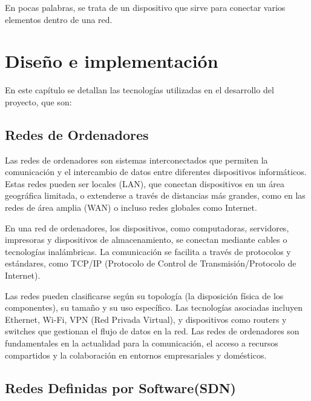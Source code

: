 \documentclass[a4paper, 12pt]{book}
\begin{document}
	En pocas palabras, se trata de un dispositivo que sirve para conectar varios elementos dentro de una red.
	
	
	\cleardoublepage
	\chapter{Diseño e implementación}
	\label{sec:diseno}
	 
		
	En este capítulo se detallan las tecnologías utilizadas en el desarrollo del proyecto, que son:
	
	\section{Redes de Ordenadores} 
	\label{sec:redes}
	
	Las redes de ordenadores son sistemas interconectados que permiten la comunicación y el intercambio de datos entre diferentes dispositivos informáticos. Estas redes pueden ser locales (LAN), que conectan dispositivos en un área geográfica limitada, o extenderse a través de distancias más grandes, como en las redes de área amplia (WAN) o incluso redes globales como Internet.
	
	En una red de ordenadores, los dispositivos, como computadoras, servidores, impresoras y dispositivos de almacenamiento, se conectan mediante cables o tecnologías inalámbricas. La comunicación se facilita a través de protocolos y estándares, como TCP/IP (Protocolo de Control de Transmisión/Protocolo de Internet).
	
	Las redes pueden clasificarse según su topología (la disposición física de los componentes), su tamaño y su uso específico. Las tecnologías asociadas incluyen Ethernet, Wi-Fi, VPN (Red Privada Virtual), y dispositivos como routers y switches que gestionan el flujo de datos en la red. Las redes de ordenadores son fundamentales en la actualidad para la comunicación, el acceso a recursos compartidos y la colaboración en entornos empresariales y domésticos.
	
	\section{Redes Definidas por Software(SDN)} 
	\label{sec:sdn}
	
\end{document}
